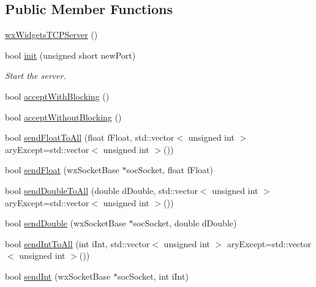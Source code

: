 \subsection*{Public Member Functions}
\begin{DoxyCompactItemize}
\item 
\hyperlink{class_rad_j_a_v_1_1_networking_1_1wx_widgets_t_c_p_server_ac000741f10b0be7e6800f948fba6cdc8}{wx\+Widgets\+T\+C\+P\+Server} ()
\item 
bool \hyperlink{class_rad_j_a_v_1_1_networking_1_1wx_widgets_t_c_p_server_aa0c34e3462f10c401629f9cea3a113a4}{init} (unsigned short new\+Port)
\begin{DoxyCompactList}\small\item\em Start the server. \end{DoxyCompactList}\item 
bool \hyperlink{class_rad_j_a_v_1_1_networking_1_1wx_widgets_t_c_p_server_a09b2a943dc69cab1aa3bf1573a8f72c1}{accept\+With\+Blocking} ()
\item 
bool \hyperlink{class_rad_j_a_v_1_1_networking_1_1wx_widgets_t_c_p_server_a1e78417fa012bebbc21fbcf8557c8008}{accept\+Without\+Blocking} ()
\item 
bool \hyperlink{class_rad_j_a_v_1_1_networking_1_1wx_widgets_t_c_p_server_a42d29962406a990eeeaa97014fae1921}{send\+Float\+To\+All} (float f\+Float, std\+::vector$<$ unsigned int $>$ ary\+Except=std\+::vector$<$ unsigned int $>$())
\item 
bool \hyperlink{class_rad_j_a_v_1_1_networking_1_1wx_widgets_t_c_p_server_a2c0f9bf6466f22c44cba8921b2086d4a}{send\+Float} (wx\+Socket\+Base $\ast$soc\+Socket, float f\+Float)
\item 
bool \hyperlink{class_rad_j_a_v_1_1_networking_1_1wx_widgets_t_c_p_server_a0a575ffac3793d7713d1ba30a64f79e8}{send\+Double\+To\+All} (double d\+Double, std\+::vector$<$ unsigned int $>$ ary\+Except=std\+::vector$<$ unsigned int $>$())
\item 
bool \hyperlink{class_rad_j_a_v_1_1_networking_1_1wx_widgets_t_c_p_server_a9cc3924985547cc4e63be3d91b57e94a}{send\+Double} (wx\+Socket\+Base $\ast$soc\+Socket, double d\+Double)
\item 
bool \hyperlink{class_rad_j_a_v_1_1_networking_1_1wx_widgets_t_c_p_server_a88939471a8291c875699b5c21897be8f}{send\+Int\+To\+All} (int i\+Int, std\+::vector$<$ unsigned int $>$ ary\+Except=std\+::vector$<$ unsigned int $>$())
\item 
bool \hyperlink{class_rad_j_a_v_1_1_networking_1_1wx_widgets_t_c_p_server_a61087019c5c04e8f53f5ab72cacd4535}{send\+Int} (wx\+Socket\+Base $\ast$soc\+Socket, int i\+Int)

\end{DoxyCompactItemize}
